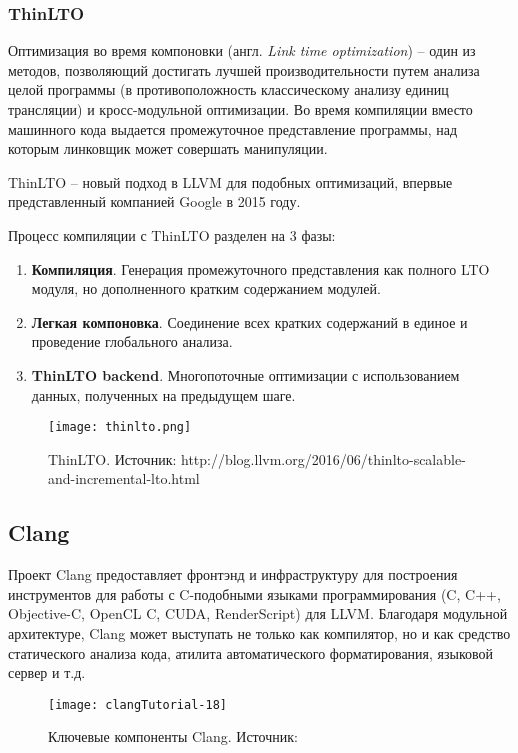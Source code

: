 \subsubsection{ThinLTO}
Оптимизация во время компоновки (англ. \textit{Link time optimization}) -- один
из методов, позволяющий достигать лучшей производительности путем анализа целой
программы (в противоположность классическому анализу единиц трансляции) и
кросс-модульной оптимизации. Во время компиляции вместо машинного кода выдается
промежуточное представление программы, над которым линковщик может совершать
манипуляции.

ThinLTO -- новый подход в LLVM для подобных оптимизаций, впервые представленный
компанией Google в 2015 году\cite{Johnson}.

Процесс компиляции с ThinLTO разделен на 3 фазы:
\begin{enumerate}
  \item \textbf{Компиляция}. Генерация промежуточного представления как полного
        LTO модуля, но дополненного кратким содержанием модулей.
  \item \textbf{Легкая компоновка}. Соединение всех кратких содержаний в единое
        и проведение глобального анализа.
  \item \textbf{ThinLTO backend}. Многопоточные оптимизации с использованием
        данных, полученных на предыдущем шаге.
\end{enumerate}
\begin{figure}[h]
  \centering
  \texttt{[image: thinlto.png]}
  \caption{ThinLTO. Источник: http://blog.llvm.org/2016/06/thinlto-scalable-and-incremental-lto.html}
\end{figure}

\subsection{Clang}
Проект Clang предоставляет фронтэнд и инфраструктуру для построения инструментов
для работы с C-подобными языками программирования (C, C++, Objective-C,
OpenCL C, CUDA, RenderScript) для LLVM. Благодаря модульной архитектуре, Clang
может выступать не только как компилятор, но и как средство статического анализа
кода, атилита автоматического форматирования, языковой сервер и т.д.

\begin{figure}[h]
  \label{fig:clang_core}
  \centering
  \texttt{[image: clangTutorial-18]}
  \caption{Ключевые компоненты Clang. Источник: \cite{VanHaagstretSvenARMandStulova2019}}
\end{figure}
